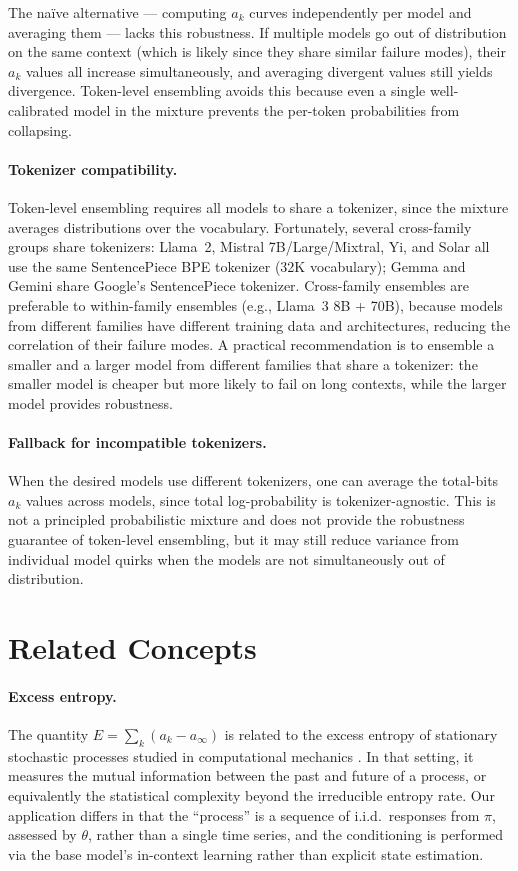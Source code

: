 \documentclass[11pt]{article}
\begin{document}
The na\"ive alternative --- computing $a_k$ curves independently per model and averaging them --- lacks this robustness. If multiple models go out of distribution on the same context (which is likely since they share similar failure modes), their $a_k$ values all increase simultaneously, and averaging divergent values still yields divergence. Token-level ensembling avoids this because even a single well-calibrated model in the mixture prevents the per-token probabilities from collapsing.

\paragraph{Tokenizer compatibility.} Token-level ensembling requires all models to share a tokenizer, since the mixture averages distributions over the vocabulary. Fortunately, several cross-family groups share tokenizers: Llama~2, Mistral 7B/Large/Mixtral, Yi, and Solar all use the same SentencePiece BPE tokenizer (32K vocabulary); Gemma and Gemini share Google's SentencePiece tokenizer. Cross-family ensembles are preferable to within-family ensembles (e.g., Llama~3 8B + 70B), because models from different families have different training data and architectures, reducing the correlation of their failure modes. A practical recommendation is to ensemble a smaller and a larger model from different families that share a tokenizer: the smaller model is cheaper but more likely to fail on long contexts, while the larger model provides robustness.

\paragraph{Fallback for incompatible tokenizers.} When the desired models use different tokenizers, one can average the total-bits $a_k$ values across models, since total log-probability is tokenizer-agnostic. This is not a principled probabilistic mixture and does not provide the robustness guarantee of token-level ensembling, but it may still reduce variance from individual model quirks when the models are not simultaneously out of distribution.

\section{Related Concepts}

\paragraph{Excess entropy.} The quantity $E = \sum_k (a_k - a_\infty)$ is related to the excess entropy of stationary stochastic processes studied in computational mechanics \citep{crutchfield2003regularities}. In that setting, it measures the mutual information between the past and future of a process, or equivalently the statistical complexity beyond the irreducible entropy rate. Our application differs in that the ``process'' is a sequence of i.i.d.\ responses from $\pi$, assessed by $\theta$, rather than a single time series, and the conditioning is performed via the base model's in-context learning rather than explicit state estimation.
\end{document}

